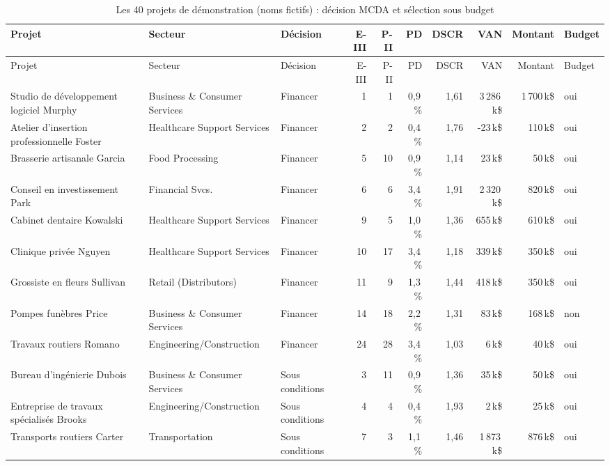 {\scriptsize\setlength{\tabcolsep}{3pt}
\begin{longtable}{p{3.7cm}p{2.5cm}lrrrrrrl}
\caption{Les 40 projets de démonstration (noms fictifs) : décision MCDA et sélection sous budget}\label{tab:projets}\\
\toprule
Projet & Secteur & Décision & E-III & P-II & PD & DSCR & VAN & Montant & Budget \\
\midrule
\endfirsthead
\toprule
Projet & Secteur & Décision & E-III & P-II & PD & DSCR & VAN & Montant & Budget \\
\midrule
\endhead
\bottomrule
\endfoot
Studio de développement logiciel Murphy & Business \& Consumer Services & Financer & 1 & 1 & 0,9\,\% & 1,61 & 3\,286\,k\$ & 1\,700\,k\$ & oui \\
Atelier d'insertion professionnelle Foster & Healthcare Support Services & Financer & 2 & 2 & 0,4\,\% & 1,76 & -23\,k\$ & 110\,k\$ & oui \\
Brasserie artisanale Garcia & Food Processing & Financer & 5 & 10 & 0,9\,\% & 1,14 & 23\,k\$ & 50\,k\$ & oui \\
Conseil en investissement Park & Financial Svcs. & Financer & 6 & 6 & 3,4\,\% & 1,91 & 2\,320\,k\$ & 820\,k\$ & oui \\
Cabinet dentaire Kowalski & Healthcare Support Services & Financer & 9 & 5 & 1,0\,\% & 1,36 & 655\,k\$ & 610\,k\$ & oui \\
Clinique privée Nguyen & Healthcare Support Services & Financer & 10 & 17 & 3,4\,\% & 1,18 & 339\,k\$ & 350\,k\$ & oui \\
Grossiste en fleurs Sullivan & Retail (Distributors) & Financer & 11 & 9 & 1,3\,\% & 1,44 & 418\,k\$ & 350\,k\$ & oui \\
Pompes funèbres Price & Business \& Consumer Services & Financer & 14 & 18 & 2,2\,\% & 1,31 & 83\,k\$ & 168\,k\$ & non \\
Travaux routiers Romano & Engineering/Construction & Financer & 24 & 28 & 3,4\,\% & 1,03 & 6\,k\$ & 40\,k\$ & oui \\
Bureau d'ingénierie Dubois & Business \& Consumer Services & Sous conditions & 3 & 11 & 0,9\,\% & 1,36 & 35\,k\$ & 50\,k\$ & oui \\
Entreprise de travaux spécialisés Brooks & Engineering/Construction & Sous conditions & 4 & 4 & 0,4\,\% & 1,93 & 2\,k\$ & 25\,k\$ & oui \\
Transports routiers Carter & Transportation & Sous conditions & 7 & 3 & 1,1\,\% & 1,46 & 1\,873\,k\$ & 876\,k\$ & oui \\

\end{longtable}}
